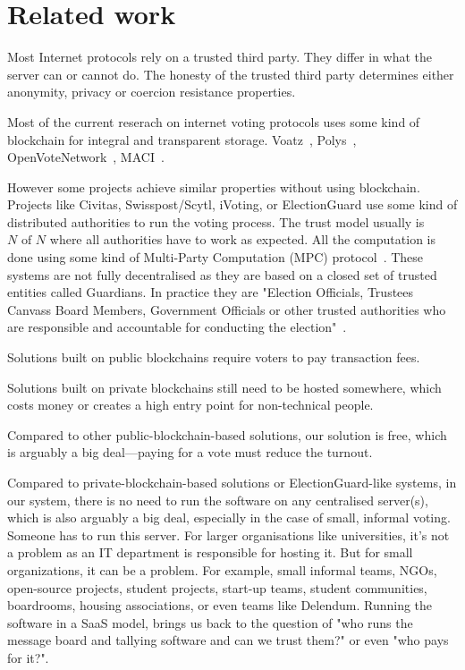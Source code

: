 \documentclass{article}
\begin{document}
\section{Related work}

Most Internet protocols rely on a trusted third party. They differ in what the server can or cannot do. The honesty of the trusted third party determines either anonymity, privacy or coercion resistance properties.



Most of the current reserach on internet voting protocols uses some kind of blockchain for integral and transparent storage. 
Voatz~\cite{mooreWestVirginiaMobile2019}, 
Polys~\cite{PolysOnlineVoting}, 
OpenVoteNetwork~\cite{haoAnonymousVotingTworound2010}, MACI~\cite{ethereumfoundationMinimalAntiCollusionInfrastructure2022}.

However some projects achieve similar properties without using blockchain. Projects like Civitas, Swisspost/Scytl, iVoting, or ElectionGuard use some kind of distributed authorities to run the voting process. The trust model usually is $N \textrm{ of } N$ where all authorities have to work as expected. All the computation is done using some kind of Multi-Party Computation (MPC) protocol~\cite{boweMultipartyProtocolConstructing2018}.
These systems are not fully decentralised as they are based on a closed set of trusted entities called Guardians. In practice they are "Election Officials, Trustees Canvass Board Members, Government Officials or other trusted authorities who are responsible and accountable for conducting the election"~\cite{ElectionGuardWhoGuardian}.


Solutions built on public blockchains require voters to pay transaction fees.

Solutions built on private blockchains still need to be hosted somewhere, which costs money or creates a high entry point for non-technical people.

Compared to other public-blockchain-based solutions, our solution is free, which is arguably a big deal—paying for a vote must reduce the turnout.

Compared to private-blockchain-based solutions or ElectionGuard-like systems, in our system, there is no need to run the software on any centralised server(s), which is also arguably a big deal, especially in the case of small, informal voting. Someone has to run this server. For larger organisations like universities, it's not a problem as an IT department is responsible for hosting it. But for small organizations, it can be a problem. For example, small informal teams, NGOs, open-source projects, student projects, start-up teams, student communities, boardrooms, housing associations, or even teams like Delendum. Running the software in a SaaS model, brings us back to the question of "who runs the message board and tallying software and can we trust them?" or even "who pays for it?".
\end{document}
